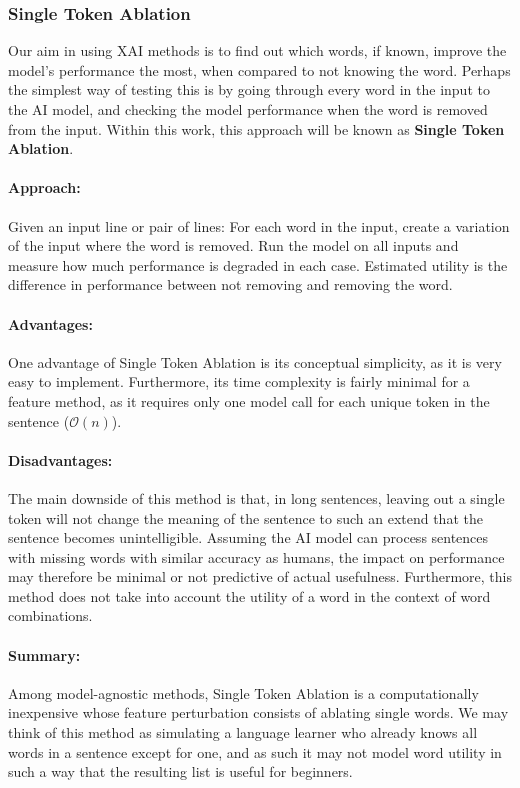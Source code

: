 \subsubsection{Single Token Ablation}
Our aim in using XAI methods is to find out which words, if known, improve the model's performance the most, when compared to not knowing the word.
Perhaps the simplest way of testing this is by going through every word in the input to the AI model, and checking the model performance when the word is removed from the input.
Within this work, this approach will be known as \textbf{Single Token Ablation}.

\paragraph{Approach:}
Given an input line or pair of lines:
For each word in the input, create a variation of the input where the word is removed.
Run the model on all inputs and measure how much performance is degraded in each case.
Estimated utility is the difference in performance between not removing and removing the word.

\paragraph{Advantages:}
One advantage of Single Token Ablation is its conceptual simplicity, as it is very easy to implement.
Furthermore, its time complexity is fairly minimal for a feature method, as it requires only one model call for each unique token in the sentence ($\mathcal{O}(n)$).

\paragraph{Disadvantages:}
The main downside of this method is that, in long sentences, leaving out a single token will not change the meaning of the sentence to such an extend that the sentence becomes unintelligible.
Assuming the AI model can process sentences with missing words with similar accuracy as humans, the impact on performance may therefore be minimal or not predictive of actual usefulness.
Furthermore, this method does not take into account the utility of a word in the context of word combinations.

\paragraph{Summary:}
Among model-agnostic methods, Single Token Ablation is a computationally inexpensive whose feature perturbation consists of ablating single words.
We may think of this method as simulating a language learner who already knows all words in a sentence except for one, and as such it may not model word utility in such a way that the resulting list is useful for beginners.

